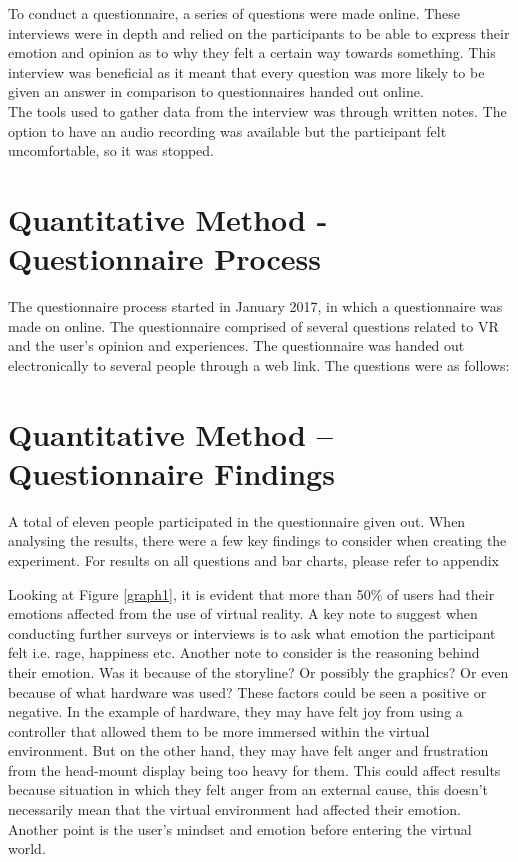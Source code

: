 \documentclass[12pt]{report}
\begin{document}
To conduct a questionnaire, a series of questions were made online. These interviews were in depth and relied on the participants to be able to express their emotion and opinion as to why they felt a certain way towards something. This interview was beneficial as it meant that every question was more likely to be given an answer in comparison to questionnaires handed out online.
\\

The tools used to gather data from the interview was through written notes. The option to have an audio recording was available but the participant felt uncomfortable, so it was stopped.

\section{Quantitative Method - Questionnaire Process} 
The questionnaire process started in January 2017, in which a questionnaire was made on online. The questionnaire comprised of several questions related to VR and the user’s opinion and experiences. The questionnaire was handed out electronically to several people through a web link. The questions were as follows:
 
 

\section{Quantitative Method – Questionnaire Findings}
A total of eleven people participated in the questionnaire given out. When analysing the results, there were a few key findings to consider when creating the experiment. For results on all questions and bar charts, please refer to appendix



	
Looking at Figure \ref{graph1}, it is evident that more than 50\% of users had their emotions affected from the use of virtual reality. A key note to suggest when conducting further surveys or interviews is to ask what emotion the participant felt i.e. rage, happiness etc. Another note to consider is the reasoning behind their emotion. Was it because of the storyline? Or possibly the graphics? Or even because of what hardware was used? These factors could be seen a positive or negative. In the example of hardware, they may have felt joy from using a controller that allowed them to be more immersed within the virtual environment. But on the other hand, they may have felt anger and frustration from the head-mount display being too heavy for them. This could affect results because situation in which they felt anger from an external cause, this doesn’t necessarily mean that the virtual environment had affected their emotion. Another point is the user’s mindset and emotion before entering the virtual world.  
\end{document}
